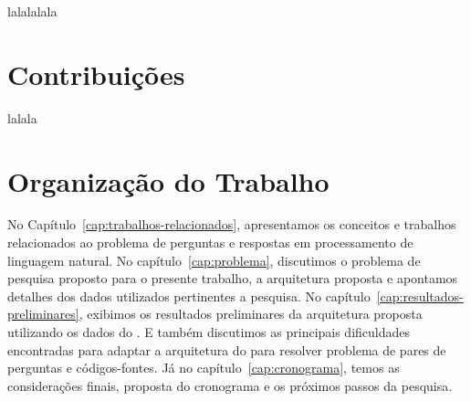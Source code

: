 lalalalala

\section{Contribuições}
\label{sec:contribucoes}

lalala

\section{Organização do Trabalho}
\label{sec:organizacao_trabalho}

No Capítulo~\ref{cap:trabalhos-relacionados}, apresentamos os conceitos e trabalhos relacionados ao problema de perguntas e respostas em processamento de linguagem natural. No capítulo~\ref{cap:problema}, discutimos o problema de pesquisa proposto para o presente trabalho, a arquitetura proposta e apontamos detalhes dos dados utilizados pertinentes a pesquisa. 
No capítulo~\ref{cap:resultados-preliminares}, exibimos os resultados preliminares da arquitetura proposta utilizando os dados do \cite{yao-2018}. E também discutimos as principais dificuldades encontradas para adaptar a arquitetura do \cite{feng-2015} para resolver problema de pares de perguntas e códigos-fontes. Já no capítulo~\ref{cap:cronograma}, temos as considerações finais, proposta do cronograma e os próximos passos da pesquisa.
